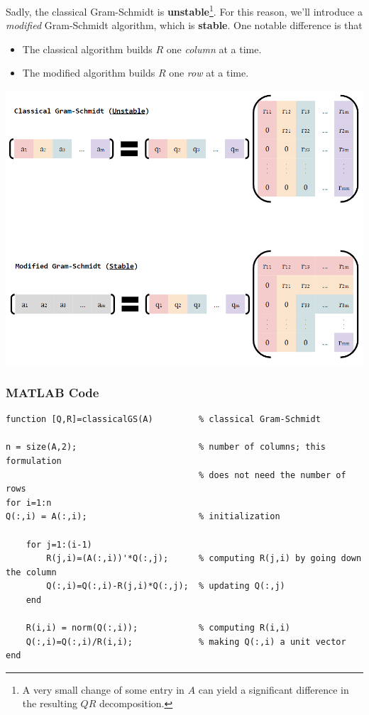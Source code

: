 \documentclass[letterpaper]{article}
\begin{document}
\bigskip 

Sadly, the classical Gram-Schmidt is \textbf{unstable}\footnote{A very small change of some entry in $A$ can yield a significant difference in the resulting $QR$ decomposition.}. For this reason, we'll introduce a \emph{modified} Gram-Schmidt algorithm, which is \textbf{stable}. One notable difference is that 
\begin{itemize}
    \item The classical algorithm builds $R$ one \emph{column} at a time. 
    \item The modified algorithm builds $R$ one \emph{row} at a time.
\end{itemize}
\begin{center}
    \includegraphics[scale=0.75]{../assets/gram.png}
\end{center}

\subsubsection{MATLAB Code}
\begin{mdframed}
    \begin{verbatim}
function [Q,R]=classicalGS(A)         % classical Gram-Schmidt

n = size(A,2);                        % number of columns; this formulation
                                      % does not need the number of rows
for i=1:n                             
Q(:,i) = A(:,i);                      % initialization
   
    for j=1:(i-1)
        R(j,i)=(A(:,i))'*Q(:,j);      % computing R(j,i) by going down the column
        Q(:,i)=Q(:,i)-R(j,i)*Q(:,j);  % updating Q(:,j)
    end
   
    R(i,i) = norm(Q(:,i));            % computing R(i,i) 
    Q(:,i)=Q(:,i)/R(i,i);             % making Q(:,i) a unit vector
end
    \end{verbatim}
\end{mdframed}
\end{document}
